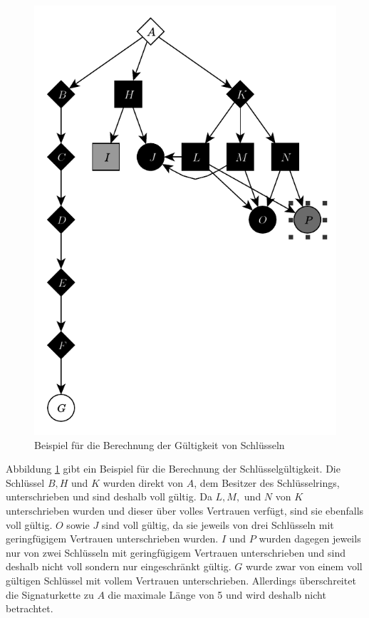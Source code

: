 \begin{figure}[t]
  \centering
  \includegraphics[scale=1.0]{images/trust-beispiel.pdf}
  \caption{Beispiel für die Berechnung der Gültigkeit von Schlüsseln}
  \label{fig:trust-beispiel}
\end{figure}

Abbildung \ref{fig:trust-beispiel} gibt ein Beispiel für die
Berechnung der Schlüsselgültigkeit. Die Schlüssel $B, H$ und $K$
wurden direkt von $A$, dem Besitzer des Schlüsselrings, unterschrieben
und sind deshalb voll gültig. Da $L, M,$ und $N$ von $K$
unterschrieben wurden und dieser über volles Vertrauen verfügt, sind
sie ebenfalls voll gültig. $O$ sowie $J$ sind voll gültig, da sie
jeweils von drei Schlüsseln mit geringfügigem Vertrauen unterschrieben
wurden. $I$ und $P$ wurden dagegen jeweils nur von zwei Schlüsseln mit
geringfügigem Vertrauen unterschrieben und sind deshalb nicht voll
sondern nur eingeschränkt gültig. $G$ wurde zwar von einem voll
gültigen Schlüssel mit vollem Vertrauen unterschrieben. Allerdings
überschreitet die Signaturkette zu $A$ die maximale Länge von 5 und
wird deshalb nicht betrachtet.



